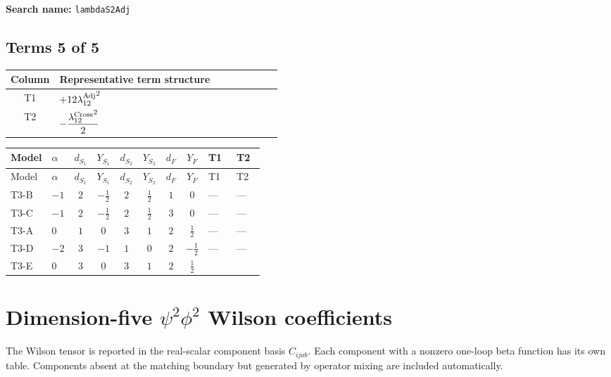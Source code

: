 \documentclass[8pt]{article}
\begin{document}
\begin{landscape}
\begin{longtable}{@{}llcccccc >{\raggedright\arraybackslash}p{0.21\linewidth} >{\raggedright\arraybackslash}p{0.21\linewidth} >{\raggedright\arraybackslash}p{0.21\linewidth}@{}}
\midrule
\bottomrule
\end{longtable}
\clearpage
\noindent\textbf{Search name: }\texttt{lambdaS2Adj}\par\smallskip
\subsection*{Terms 5 of 5}
\begin{center}
\begin{tabular}{@{}c >{\raggedright\arraybackslash}p{0.82\linewidth}@{}}
\toprule
Column & Representative term structure \\
\midrule
T1 & \(\displaystyle +12 {\lambda_{12}^{\rm Adj}}^2\) \\
\midrule
T2 & \(\displaystyle -\frac{{\lambda_{12}^{\rm Cross}}^2}{2}\) \\
\midrule
\bottomrule
\end{tabular}
\end{center}
\smallskip
\tiny
\begin{longtable}{@{}llcccccc >{\raggedright\arraybackslash}p{0.21\linewidth} >{\raggedright\arraybackslash}p{0.21\linewidth}@{}}
\toprule
Model & $\alpha$ & $d_{S_1}$ & $Y_{S_1}$ & $d_{S_2}$ & $Y_{S_2}$ & $d_F$ & $Y_F$ & T1 & T2 \\
\midrule
\endfirsthead
\toprule
Model & $\alpha$ & $d_{S_1}$ & $Y_{S_1}$ & $d_{S_2}$ & $Y_{S_2}$ & $d_F$ & $Y_F$ & T1 & T2 \\
\midrule
\endhead
T3-B & $-1$ & $2$ & $-\frac{1}{2}$ & $2$ & $\frac{1}{2}$ & $1$ & $0$ & --- & --- \\
\midrule
T3-C & $-1$ & $2$ & $-\frac{1}{2}$ & $2$ & $\frac{1}{2}$ & $3$ & $0$ & --- & --- \\
\midrule
T3-A & $0$ & $1$ & $0$ & $3$ & $1$ & $2$ & $\frac{1}{2}$ & --- & --- \\
\midrule
T3-D & $-2$ & $3$ & $-1$ & $1$ & $0$ & $2$ & $-\frac{1}{2}$ & --- & --- \\
\midrule
T3-E & $0$ & $3$ & $0$ & $3$ & $1$ & $2$ & $\frac{1}{2}$ & \scriptsize\adjustbox{max width=\linewidth}{$\begin{gathered} +12 {\lambda_{12}^{\rm Adj}}^2\end{gathered}$} & \scriptsize\adjustbox{max width=\linewidth}{$\begin{gathered} -\frac{{\lambda_{12}^{\rm Cross}}^2}{2}\end{gathered}$} \\
\midrule
\bottomrule
\end{longtable}
\clearpage
\section*{Dimension-five $\psi^2\phi^2$ Wilson coefficients}
The Wilson tensor is reported in the real-scalar component basis $C_{ijab}$. Each component with a nonzero one-loop beta function has its own table. Components absent at the matching boundary but generated by operator mixing are included automatically.

\end{landscape}
\end{document}
